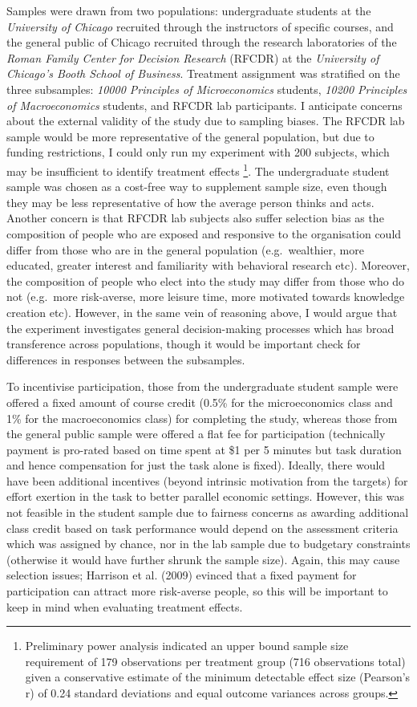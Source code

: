 \documentclass[
  12,
  letterpaper,
  DIV=11,
  numbers=noendperiod]{scrartcl}
\begin{document}
Samples were drawn from two populations: undergraduate students at the
\emph{University of Chicago} recruited through the instructors of
specific courses, and the general public of Chicago recruited through
the research laboratories of the \emph{Roman Family Center for Decision
Research} (RFCDR) at the \emph{University of Chicago's Booth School of
Business}. Treatment assignment was stratified on the three subsamples:
\emph{10000 Principles of Microeconomics} students, \emph{10200
Principles of Macroeconomics} students, and RFCDR lab participants. I
anticipate concerns about the external validity of the study due to
sampling biases. The RFCDR lab sample would be more representative of
the general population, but due to funding restrictions, I could only
run my experiment with 200 subjects, which may be insufficient to
identify treatment effects \footnote{Preliminary power analysis
  indicated an upper bound sample size requirement of 179 observations
  per treatment group (716 observations total) given a conservative
  estimate of the minimum detectable effect size (Pearson's r) of 0.24
  standard deviations and equal outcome variances across groups.}. The
undergraduate student sample was chosen as a cost-free way to supplement
sample size, even though they may be less representative of how the
average person thinks and acts. Another concern is that RFCDR lab
subjects also suffer selection bias as the composition of people who are
exposed and responsive to the organisation could differ from those who
are in the general population (e.g.~wealthier, more educated, greater
interest and familiarity with behavioral research etc). Moreover, the
composition of people who elect into the study may differ from those who
do not (e.g.~more risk-averse, more leisure time, more motivated towards
knowledge creation etc). However, in the same vein of reasoning above, I
would argue that the experiment investigates general decision-making
processes which has broad transference across populations, though it
would be important check for differences in responses between the
subsamples.

To incentivise participation, those from the undergraduate student
sample were offered a fixed amount of course credit (0.5\% for the
microeconomics class and 1\% for the macroeconomics class) for
completing the study, whereas those from the general public sample were
offered a flat fee for participation (technically payment is pro-rated
based on time spent at \$1 per 5 minutes but task duration and hence
compensation for just the task alone is fixed). Ideally, there would
have been additional incentives (beyond intrinsic motivation from the
targets) for effort exertion in the task to better parallel economic
settings. However, this was not feasible in the student sample due to
fairness concerns as awarding additional class credit based on task
performance would depend on the assessment criteria which was assigned
by chance, nor in the lab sample due to budgetary constraints (otherwise
it would have further shrunk the sample size). Again, this may cause
selection issues; Harrison et al. (2009) evinced that a fixed payment
for participation can attract more risk-averse people, so this will be
important to keep in mind when evaluating treatment effects.
\end{document}
